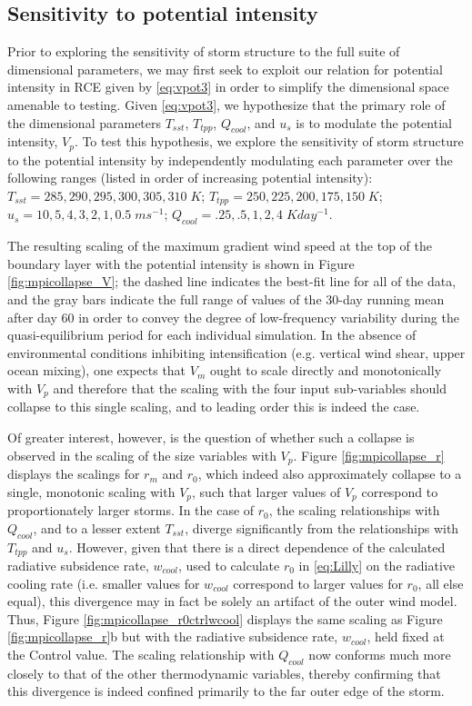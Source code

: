 \documentclass[12pt]{article}
\begin{document}
\subsection{Sensitivity to potential intensity} \label{subsec: Vpsensitivity}
Prior to exploring the sensitivity of storm structure to the full suite of dimensional parameters, we may first seek to exploit our relation for potential intensity in RCE given by \eqref{eq:vpot3} in order to simplify the dimensional space amenable to testing. Given \eqref{eq:vpot3}, we hypothesize that the primary role of the dimensional parameters $T_{sst}$, $T_{tpp}$, $Q_{cool}$, and $u_s$ is to modulate the potential intensity, $V_p$. To test this hypothesis, we explore the sensitivity of storm structure to the potential intensity by independently modulating each parameter over the following ranges (listed in order of increasing potential intensity): $T_{sst} = 285, 290, 295, 300, 305, 310 \; K$; $T_{tpp} = 250, 225, 200, 175, 150 \; K$; $u_s = 10, 5, 4, 3, 2, 1, 0.5 \; ms^{-1}$; $Q_{cool} = .25, .5, 1, 2, 4 \; K day^{-1}$. 

The resulting scaling of the maximum gradient wind speed at the top of the boundary layer with the potential intensity is shown in Figure \ref{fig:mpicollapse_V}; the dashed line indicates the best-fit line for all of the data, and the gray bars indicate the full range of values of the 30-day running mean after day 60 in order to convey the degree of low-frequency variability during the quasi-equilibrium period for each individual simulation.  In the absence of environmental conditions inhibiting intensification (e.g. vertical wind shear, upper ocean mixing), one expects that $V_m$ ought to scale directly and monotonically with $V_p$ and therefore that the scaling with the four input sub-variables should collapse to this single scaling, and to leading order this is indeed the case.

Of greater interest, however, is the question of whether such a collapse is observed in the scaling of the size variables with $V_p$. Figure \ref{fig:mpicollapse_r} displays the scalings for $r_m$ and $r_0$, which indeed also approximately collapse to a single, monotonic scaling with $V_p$, such that larger values of $V_p$ correspond to proportionately larger storms.  In the case of $r_0$, the scaling relationships with $Q_{cool}$, and to a lesser extent $T_{sst}$, diverge significantly from the relationships with $T_{tpp}$ and $u_s$. However, given that there is a direct dependence of the calculated radiative subsidence rate, $w_{cool}$, used to calculate $r_0$ in \eqref{eq:Lilly} on the radiative cooling rate (i.e. smaller values for $w_{cool}$ correspond to larger values for $r_0$, all else equal), this divergence may in fact be solely an artifact of the outer wind model. Thus, Figure \ref{fig:mpicollapse_r0ctrlwcool} displays the same scaling as Figure \ref{fig:mpicollapse_r}b but with the radiative subsidence rate, $w_{cool}$, held fixed at the Control value. The scaling relationship with $Q_{cool}$ now conforms much more closely to that of the other thermodynamic variables, thereby confirming that this divergence is indeed confined primarily to the far outer edge of the storm.
\end{document}
